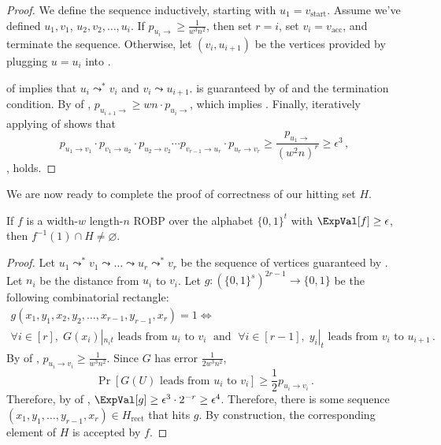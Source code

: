 \begin{proof}
We define the sequence inductively, starting with $u_1 = v_{\text{start}}$. Assume we've defined $u_1, v_1$, $u_2, v_2, \dots, u_i$. If $p_{u_i \to} \geq \frac{1}{w^3n^2}$, then set $r = i$, set $v_i = v_{\text{acc}}$, and terminate the sequence. Otherwise, let $(v_i, u_{i + 1})$ be the vertices provided by plugging $u = u_i$ into .

 of  implies that $u_i \leadsto^* v_i$ and $v_i \leadsto u_{i + 1}$.  is guaranteed by  of  and the termination condition. By  of , $p_{u_{i + 1} \to} \geq wn \cdot p_{u_i \to}$, which implies . Finally, iteratively applying  of  shows that
$$
p_{u_1 \to v_1} \cdot p_{v_1 \to u_2} \cdot p_{u_2 \to v_2} \cdots p_{v_{r - 1} \to u_r} \cdot p_{u_r \to v_r} \geq \frac{p_{u_1 \to}}{(w^2 n)^r} \geq \epsilon^3\,,
$$
\ie,  holds.
\end{proof}

We are now ready to complete the proof of correctness of our hitting set $H$.
\begin{claim}
If $f$ is a width-$w$ length-$n$ ROBP over the alphabet $\{0, 1\}^t$ with $\ExpVal[f] \geq \epsilon$, then $f^{-1}(1) \cap H \neq \varnothing$.
\end{claim}

\begin{proof}
Let $u_1 \leadsto^* v_1 \leadsto \dots \leadsto u_r \leadsto^* v_r$ be the sequence of vertices guaranteed by . Let $n_i$ be the distance from $u_i$ to $v_i$. Let $g \colon (\{0, 1\}^s)^{2r - 1} \to \{0, 1\}$ be the following combinatorial rectangle:
\begin{multline*}
g(x_1, y_1, x_2, y_2, \dots, x_{r - 1}, y_{r - 1}, x_r) = 1 \iff \\
\forall i \in [r], \; G(x_i)|_{n_i t} \text{ leads from } u_i \text{ to } v_i \; \text{ and } \; \forall i \in [r - 1], \; y_i|_t \text{ leads from } v_i \text{ to } u_{i + 1}\,.
\end{multline*}
By  of , $p_{u_i \to v_i} \geq \frac{1}{w^3 n^2}$. Since $G$ has error $\frac{1}{2w^3 n^2}$,
$$
\Pr[G(U) \text{ leads from } u_i \text{ to } v_i] \geq \frac{1}{2} p_{u_i \to v_i}\,.
$$
Therefore, by  of , $\ExpVal[g] \geq \epsilon^3 \cdot 2^{-r} \geq \epsilon^4$. Therefore, there is some sequence $(x_1, y_1, \dots, y_{r - 1}, x_r) \in H_{\text{rect}}$ that hits $g$. By construction, the corresponding element of $H$ is accepted by $f$.
\end{proof}


